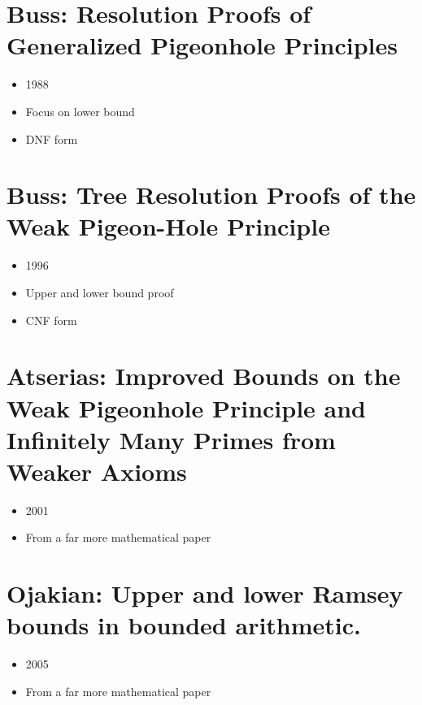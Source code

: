 \documentclass{report}
\begin{document}
\section{Buss: Resolution Proofs of Generalized Pigeonhole Principles}
\label{sec:Buss88GeneralProof}
\begin{itemize}
  \item 1988
  \item Focus on lower bound
  \item DNF form
\end{itemize}
\cite{Buss88GeneralProof}

\section{Buss: Tree Resolution Proofs of the Weak Pigeon-Hole Principle}
\label{sec:Buss96resolution}
\begin{itemize}
  \item 1996
  \item Upper and lower bound proof
  \item CNF form
\end{itemize}
\cite{Buss96resolution}



\section{Atserias: Improved Bounds on the Weak Pigeonhole Principle and Infinitely Many Primes from Weaker Axioms}
\label{sec:AtseriasImprovedBounds}
\begin{itemize}
  \item 2001
  \item From a far more mathematical paper
\end{itemize}
\cite{AtseriasImprovedBounds}


\section{Ojakian: Upper and lower Ramsey bounds in bounded arithmetic.}
\label{sec:Ojakian05UpperLower}
\begin{itemize}
  \item 2005
  \item From a far more mathematical paper
\end{itemize}
\cite{Ojakian05UpperLower}




\end{document}
